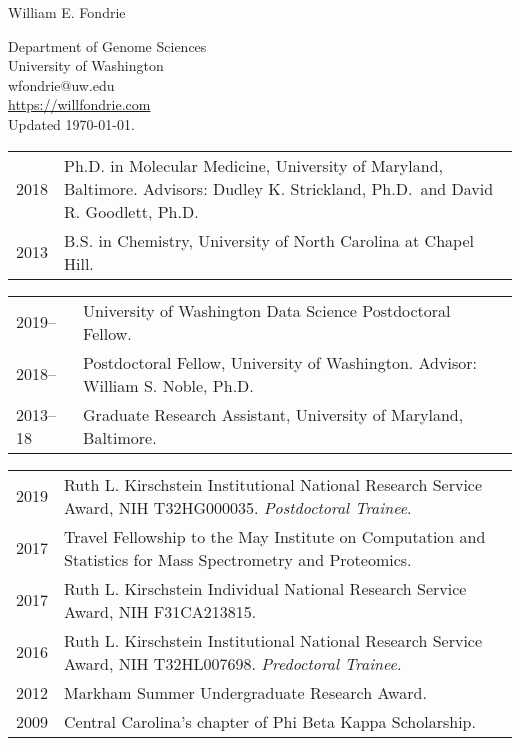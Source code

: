 \documentclass{article}
\newcommand{\mysection}[1]{\vspace{1ex}{\bf #1}}
\begin{document}
\begin{center}
  {\Large William E. Fondrie}

  Department of Genome Sciences\\
  University of Washington\\
  wfondrie@uw.edu \\
  \url{https://willfondrie.com}\\
  Updated \today.
\end{center}

\mysection{Education}

\begin{tabular}{p{0.5in}p{5.75in}}
  2018 & Ph.D. in Molecular Medicine, University of Maryland, Baltimore.
         \newline Advisors: Dudley K. Strickland, Ph.D.\
         and David R. Goodlett, Ph.D.\\
  2013 & B.S. in Chemistry, University of North Carolina at Chapel Hill.\\
\end{tabular}

\mysection{Employment and Professional Appointments}

\begin{tabular}{p{0.5in}p{5.75in}}
  2019--   & University of Washington Data Science Postdoctoral Fellow.\\
  2018--   & Postdoctoral Fellow, University of Washington.
             \newline Advisor: William S. Noble, Ph.D.\\
  2013--18 & Graduate Research Assistant, University of Maryland,
             Baltimore.\\

\end{tabular}

\mysection{Awards and Honors}

\begin{tabular}{p{0.5in}p{5.75in}}
  2019 & Ruth L. Kirschstein Institutional National Research Service Award,
         NIH T32HG000035.
         \newline \textit{Postdoctoral Trainee}.\\
  2017 & Travel Fellowship to the May Institute on Computation and Statistics
         for Mass Spectrometry and Proteomics.\\
  2017 & Ruth L. Kirschstein Individual National Research Service Award,
         NIH F31CA213815. \\
  2016 & Ruth L. Kirschstein Institutional National Research Service Award,
         NIH T32HL007698.
         \newline \textit{Predoctoral Trainee}.\\
  2012 & Markham Summer Undergraduate Research Award.\\
  2009 & Central Carolina's chapter of Phi Beta Kappa Scholarship.\\
\end{tabular}
\end{document}
